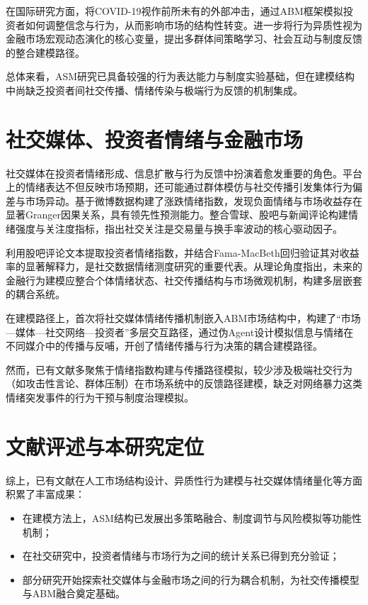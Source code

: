 在国际研究方面，\textcite{gatti2020learningcovid}将COVID-19视作前所未有的外部冲击，通过ABM框架模拟投资者如何调整信念与行为，从而影响市场的结构性转变。\textcite{dawid2023behavioralheterogeneity}进一步将行为异质性视为金融市场宏观动态演化的核心变量，提出多群体间策略学习、社会互动与制度反馈的整合建模路径。

总体来看，ASM研究已具备较强的行为表达能力与制度实验基础，但在建模结构中尚缺乏投资者间社交传播、情绪传染与极端行为反馈的机制集成。

\section{社交媒体、投资者情绪与金融市场}

社交媒体在投资者情绪形成、信息扩散与行为反馈中扮演着愈发重要的角色。平台上的情绪表达不但反映市场预期，还可能通过群体模仿与社交传播引发集体行为偏差与市场异动。\textcite{cheng2020mediaemotion}基于微博数据构建了涨跌情绪指数，发现负面情绪与市场收益存在显著Granger因果关系，具有领先性预测能力。\textcite{shi2021attentionemotion}整合雪球、股吧与新闻评论构建情绪强度与关注度指标，指出社交关注是交易量与换手率波动的核心驱动因子。

\textcite{li2019emotionreturn}利用股吧评论文本提取投资者情绪指数，并结合Fama-MacBeth回归验证其对收益率的显著解释力，是社交数据情绪测度研究的重要代表。\textcite{liu2020abmreview}从理论角度指出，未来的金融行为建模应整合个体情绪状态、社交传播结构与市场微观机制，构建多层嵌套的耦合系统。

在建模路径上，\textcite{vanfossan2020abmsocial}首次将社交媒体情绪传播机制嵌入ABM市场结构中，构建了“市场—媒体—社交网络—投资者”多层交互路径，通过伪Agent设计模拟信息与情绪在不同媒介中的传播与反哺，开创了情绪传播与行为决策的耦合建模路径。

然而，已有文献多聚焦于情绪指数构建与传播路径模拟，较少涉及极端社交行为（如攻击性言论、群体压制）在市场系统中的反馈路径建模，缺乏对网络暴力这类情绪突发事件的行为干预与制度治理模拟。

\section{文献评述与本研究定位}

综上，已有文献在人工市场结构设计、异质性行为建模与社交媒体情绪量化等方面积累了丰富成果：

\begin{itemize}
  \item 在建模方法上，ASM结构已发展出多策略融合、制度调节与风险模拟等功能性机制；
  \item 在社交研究中，投资者情绪与市场行为之间的统计关系已得到充分验证；
  \item 部分研究开始探索社交媒体与金融市场之间的行为耦合机制，为社交传播模型与ABM融合奠定基础。
\end{itemize}

